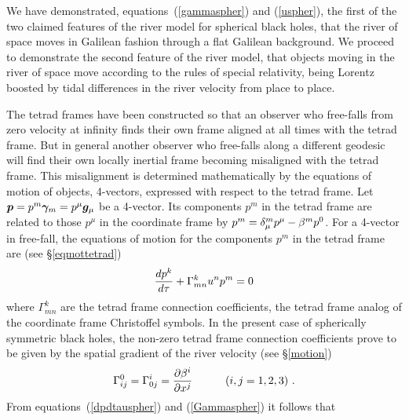 \documentclass[twocolumn,showpacs,preprintnumbers,amsmath,amssymb,prb]{revtex4}
\begin{document}
We have demonstrated, equations~(\ref{gammaspher}) and (\ref{uspher}),
the first of the two claimed features of the river model for
spherical black holes,
that the river of space moves in Galilean fashion
through a flat Galilean background.
We proceed to demonstrate the second feature of the river model,
that objects moving in the river of space
move according to the rules of special relativity,
being Lorentz boosted by tidal differences in the river velocity
from place to place.

The tetrad frames have been constructed so that
an observer who free-falls from zero velocity at infinity
finds their own frame aligned at all times with the tetrad frame.
But in general another observer who free-falls along a different
geodesic will find their own locally inertial frame becoming misaligned
with the tetrad frame.
This misalignment is determined mathematically by the equations of motion
of objects, 4-vectors, expressed with respect to the tetrad frame.
Let $\bm{p} = p^m \bm{\gamma}_m = p^\mu \bm{g}_\mu$ be a 4-vector.
Its components $p^m$ in the tetrad frame are related to those $p^\mu$
in the coordinate frame by
$p^m = \delta_\mu^m p^\mu - \beta^m p^0$.
For a 4-vector in free-fall,
the equations of motion for the components $p^m$ in the tetrad frame are
(see \S\ref{eqmottetrad})
\begin{equation}
\label{dpdtauspher}
  {dp^k \over d\tau} + \Gamma^k_{mn} u^n p^m = 0
\end{equation}
where $\Gamma^k_{mn}$
are the tetrad frame connection coefficients,
the tetrad frame analog of the coordinate frame Christoffel symbols.
In the present case of spherically symmetric black holes,
the non-zero tetrad frame connection coefficients prove to be
given by the spatial gradient of the river velocity
(see \S\ref{motion})
\begin{equation}
\label{Gammaspher}
  \Gamma^0_{ij}
  =
  \Gamma^i_{0j}
  =
  {\partial \beta^i \over \partial x^j}
  \quad
  \qquad (i,j = 1,2,3)
  \ .
\end{equation}
From equations~(\ref{dpdtauspher}) and (\ref{Gammaspher}) it follows that
\end{document}
